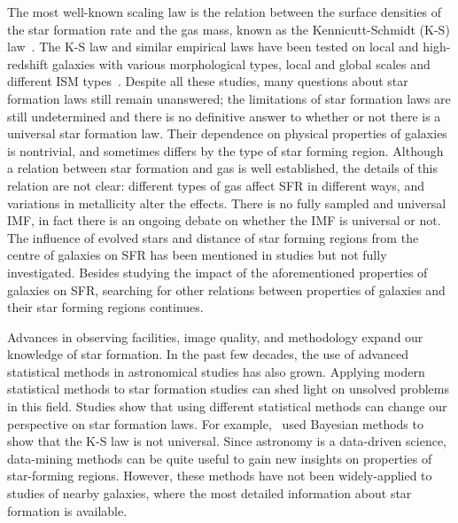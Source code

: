 The most well-known scaling law is the relation between the surface densities of the star formation rate and the gas mass, known as the Kennicutt-Schmidt (K-S) law~\citep{Schmidt59, Kennicutt98a}. 
The K-S law and similar empirical laws have been tested on local and high-redshift galaxies with various morphological types, local and global scales and different ISM types~\citep[e.g.][]{Kennicutt08,Bigiel08,Genzel10,Gnedin10,Shi11}.
Despite all these studies, many questions about star formation laws still remain unanswered; the limitations of star formation laws are still undetermined and there is no definitive answer to whether or not there is a universal star formation law.
Their dependence on physical properties of galaxies is nontrivial, and sometimes differs by the type of star forming region.
Although a relation between star formation and gas is well established, the details of this relation are not clear:
different types of gas affect SFR in different ways, and variations in metallicity alter the effects.
There is no fully sampled and universal IMF, in fact there is an ongoing debate on whether the IMF is universal or not.
The influence of evolved stars and distance of star forming regions from the centre of galaxies on SFR has been mentioned in studies but not fully investigated.
Besides studying the impact of the aforementioned properties of galaxies on SFR, searching for other relations between properties of galaxies and their star forming regions continues.

Advances in observing facilities, image quality, and methodology expand our knowledge of star formation. 
In the past few decades, the use of advanced statistical methods in astronomical studies has also grown.
Applying modern statistical methods to star formation studies can shed light on unsolved problems in this field. 
Studies show that using different statistical methods can change our perspective on star formation laws. 
For example,~\cite{Shetty13} used Bayesian methods to show that the K-S law is not universal. 
Since astronomy is a data-driven science, data-mining methods can be quite useful to gain new insights on properties of star-forming regions. 
However, these methods have not been widely-applied to studies of nearby galaxies, where the most detailed information about star formation is available.

